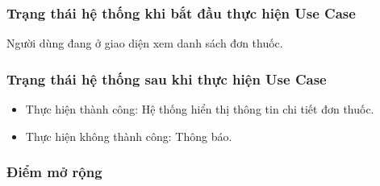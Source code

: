 \subsubsection{Trạng thái hệ thống khi bắt đầu thực hiện Use Case}
Người dùng đang ở giao diện xem danh sách đơn thuốc.

\subsubsection{Trạng thái hệ thống sau khi thực hiện Use Case}
\begin{itemize}
  \item Thực hiện thành công: Hệ thống hiển thị thông tin chi tiết đơn thuốc.
  \item Thực hiện không thành công: Thông báo.
\end{itemize}

\subsubsection{Điểm mở rộng}